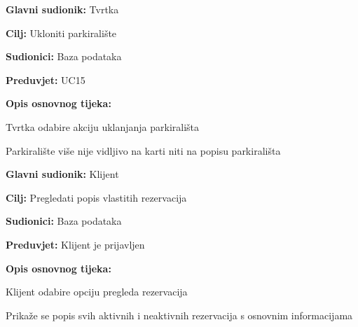 \noindent {}
\begin{packed_item}
	
	\item \textbf{Glavni sudionik:} Tvrtka
	\item \textbf{Cilj:} Ukloniti parkiralište
	\item \textbf{Sudionici:} Baza podataka
	\item \textbf{Preduvjet:} UC15
	\item \textbf{Opis osnovnog tijeka:}
	
	\item[] \begin{packed_enum}
		
		\item Tvrtka odabire akciju uklanjanja parkirališta
		\item Parkiralište više nije vidljivo na karti niti na popisu parkirališta

	\end{packed_enum}
\end{packed_item}

\pagebreak

\noindent {}
\begin{packed_item}
	
	\item \textbf{Glavni sudionik: } Klijent
	\item \textbf{Cilj:} Pregledati popis vlastitih rezervacija
	\item \textbf{Sudionici:} Baza podataka
	\item \textbf{Preduvjet:} Klijent je prijavljen
	\item \textbf{Opis osnovnog tijeka:}
	
	\item[] \begin{packed_enum}
		
		\item Klijent odabire opciju pregleda rezervacija
		\item Prikaže se popis svih aktivnih i neaktivnih rezervacija s osnovnim informacijama

	\end{packed_enum}
\end{packed_item}

